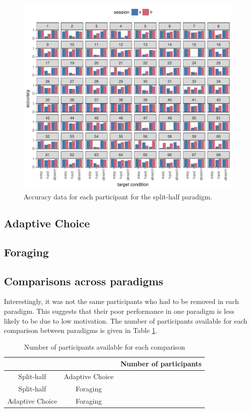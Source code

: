 \documentclass[a4paper, oneside, 11pt, onecolumn]{article}
\begin{document}
\begin{figure}
\centering
\includegraphics[width=14cm]{../Scripts/lineseg/scratch/acc_by_session_by_person.pdf}
\caption{Accuracy data for each participant for the split-half paradigm.}
\label{fig:splithalf_acc_all}
\end{figure}

\subsection{Adaptive Choice}

\subsection{Foraging}

\subsection{Comparisons across paradigms}

Interestingly, it was not the same participants who had to be removed in each paradigm. This suggests that their poor performance in one paradigm is less likely to be due to low motivation. The number of participants available for each comparison between paradigms is given in Table \ref{tab:num_per_paradigm}.

\begin{table}
\centering
\small
\begin{tabular}{cc|c}
 			&					& Number of participants\\
\hline
Split-half 	& Adaptive Choice 	& \\
Split-half 	& Foraging 			& \\
Adaptive Choice & Foraging 		& \\
\end{tabular}
\caption{Number of participants available for each comparison}
\label{tab:num_per_paradigm}
\end{table}
\end{document}
